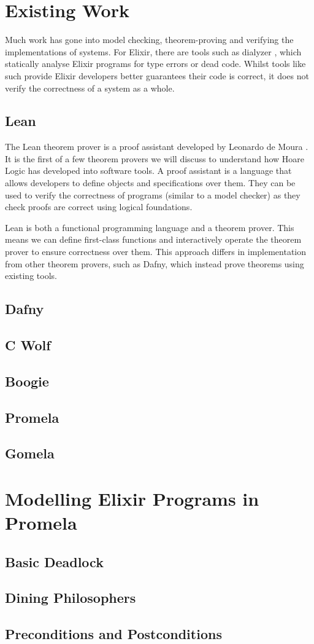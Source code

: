 \section[]{Existing Work}
Much work has gone into model checking, theorem-proving and verifying the implementations of systems. For Elixir, there are tools such as dialyzer \cite{dialyzer}, which statically analyse Elixir programs for type errors or dead code. Whilst tools like such provide Elixir developers better guarantees their code is correct, it does not verify the correctness of a system as a whole. 
\subsection[]{Lean}
The Lean theorem prover is a proof assistant developed by Leonardo de Moura \cite{lean}. It is the first of a few theorem provers we will discuss to understand how Hoare Logic has developed into software tools. A proof assistant is a language that allows developers to define objects and specifications over them. They can be used to verify the correctness of programs (similar to a model checker) as they check proofs are correct using logical foundations.
\par
Lean is both a functional programming language and a theorem prover. This means we can define first-class functions and interactively operate the theorem prover to ensure correctness over them. This approach differs in implementation from other theorem provers, such as Dafny, which instead prove theorems using existing tools. 

\subsection[]{Dafny}
\subsection[]{C Wolf}
\subsection[]{Boogie}
\subsection[]{Promela}
\subsection[]{Gomela}
\section[]{Modelling Elixir Programs in Promela}
\subsection[]{Basic Deadlock}
\subsection[]{Dining Philosophers}
\subsection[]{Preconditions and Postconditions}

